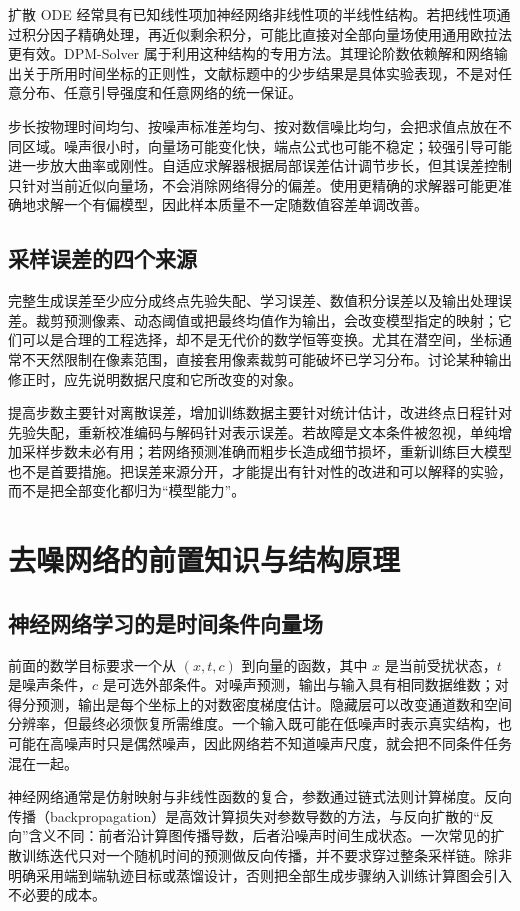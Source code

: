 \documentclass[UTF8,12pt,a4paper,fontset=fandol]{ctexart}
\begin{document}
扩散 ODE 经常具有已知线性项加神经网络非线性项的半线性结构。若把线性项通过积分因子精确处理，再近似剩余积分，可能比直接对全部向量场使用通用欧拉法更有效。DPM-Solver 属于利用这种结构的专用方法\cite{lu2022}。其理论阶数依赖解和网络输出关于所用时间坐标的正则性，文献标题中的少步结果是具体实验表现，不是对任意分布、任意引导强度和任意网络的统一保证。

步长按物理时间均匀、按噪声标准差均匀、按对数信噪比均匀，会把求值点放在不同区域。噪声很小时，向量场可能变化快，端点公式也可能不稳定；较强引导可能进一步放大曲率或刚性。自适应求解器根据局部误差估计调节步长，但其误差控制只针对当前近似向量场，不会消除网络得分的偏差。使用更精确的求解器可能更准确地求解一个有偏模型，因此样本质量不一定随数值容差单调改善。

\subsection{采样误差的四个来源}
完整生成误差至少应分成终点先验失配、学习误差、数值积分误差以及输出处理误差。裁剪预测像素、动态阈值或把最终均值作为输出，会改变模型指定的映射；它们可以是合理的工程选择，却不是无代价的数学恒等变换。尤其在潜空间，坐标通常不天然限制在像素范围，直接套用像素裁剪可能破坏已学习分布。讨论某种输出修正时，应先说明数据尺度和它所改变的对象。

提高步数主要针对离散误差，增加训练数据主要针对统计估计，改进终点日程针对先验失配，重新校准编码与解码针对表示误差。若故障是文本条件被忽视，单纯增加采样步数未必有用；若网络预测准确而粗步长造成细节损坏，重新训练巨大模型也不是首要措施。把误差来源分开，才能提出有针对性的改进和可以解释的实验，而不是把全部变化都归为“模型能力”。

\section{去噪网络的前置知识与结构原理}
\label{sec:diff-network}
\subsection{神经网络学习的是时间条件向量场}
前面的数学目标要求一个从 $(x,t,c)$ 到向量的函数，其中 $x$ 是当前受扰状态，$t$ 是噪声条件，$c$ 是可选外部条件。对噪声预测，输出与输入具有相同数据维数；对得分预测，输出是每个坐标上的对数密度梯度估计。隐藏层可以改变通道数和空间分辨率，但最终必须恢复所需维度。一个输入既可能在低噪声时表示真实结构，也可能在高噪声时只是偶然噪声，因此网络若不知道噪声尺度，就会把不同条件任务混在一起。

神经网络通常是仿射映射与非线性函数的复合，参数通过链式法则计算梯度。反向传播（backpropagation）是高效计算损失对参数导数的方法，与反向扩散的“反向”含义不同：前者沿计算图传播导数，后者沿噪声时间生成状态。一次常见的扩散训练迭代只对一个随机时间的预测做反向传播，并不要求穿过整条采样链。除非明确采用端到端轨迹目标或蒸馏设计，否则把全部生成步骤纳入训练计算图会引入不必要的成本。
\end{document}
